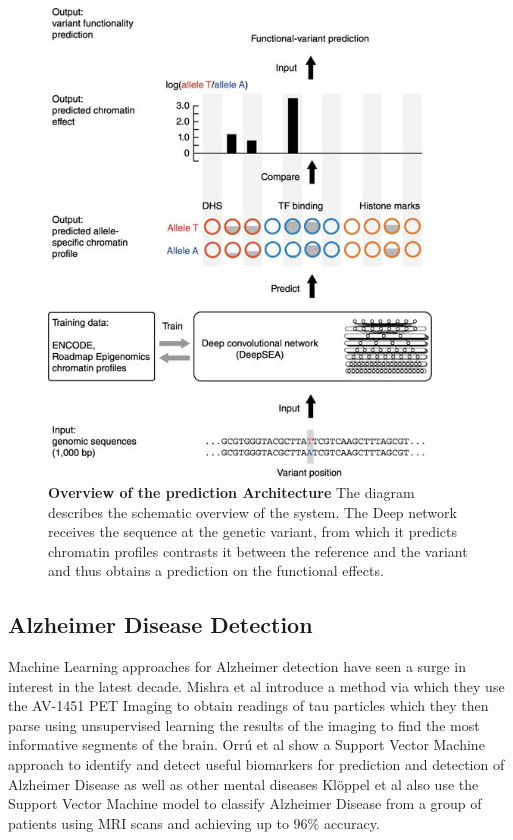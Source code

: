 \begin{figure}[!ht]
\centerline{\includegraphics[width=4in]{images/background/predeff.jpg}}
\caption{{\bf Overview of the prediction Architecture\cite{Zhou2017}} The diagram describes the schematic overview of the system. The Deep network receives the sequence at the genetic variant, from which it predicts chromatin profiles contrasts it between the reference and the variant and thus obtains a prediction on the functional effects.}
\label{predeff1}
\end{figure}
\newpage
\subsection{Alzheimer Disease Detection}

Machine Learning approaches for Alzheimer detection have seen a surge in interest in the latest decade. Mishra et al introduce\cite{Mishra2017} a method via which they use the AV-1451 PET Imaging to obtain readings of tau particles which they then parse using unsupervised learning the results of the imaging to find the most informative segments of the brain. Orrú et al show\cite{Orru2012} a Support Vector Machine approach to identify and detect useful biomarkers for prediction and detection of Alzheimer Disease as well as other mental diseases Klöppel et al\cite{Kloppel2008} also use the Support Vector Machine model to classify Alzheimer Disease from a group of patients using MRI scans and achieving up to $96\%$ accuracy.


